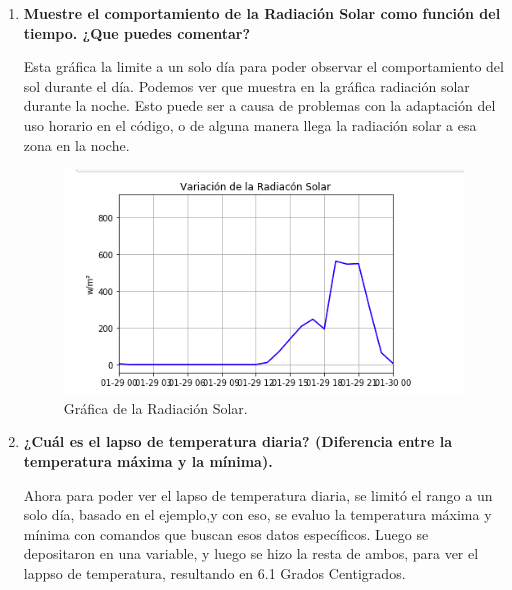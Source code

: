\documentclass[a4paper]{article}
\begin{document}
\begin{enumerate}
\item\textbf{Muestre el comportamiento de la Radiación Solar como función del tiempo. ¿Que puedes comentar?}

Esta gráfica la limite a un solo día para poder observar el comportamiento del sol durante el día. Podemos ver que muestra en la gráfica radiación solar durante la noche. Esto puede ser a causa de problemas con la adaptación del uso horario en el código, o de alguna manera llega la radiación solar a esa zona en la noche. 

\begin{figure}[h!]
  \centering
  \includegraphics[width=0.6\linewidth]{ActGraf3.png}
  \caption{Gráfica de la Radiación Solar.}
\end{figure}


\item\textbf{¿Cuál es el lapso de temperatura diaria? (Diferencia entre la temperatura máxima y la mínima).}

Ahora para poder ver el lapso de temperatura diaria, se limitó el rango a un solo día, basado en el ejemplo,y con eso, se evaluo la temperatura máxima y mínima con comandos que buscan esos datos específicos. Luego se depositaron en una variable, y luego se hizo la resta de ambos, para ver el lappso de temperatura, resultando en 6.1 Grados Centigrados. 


\end{enumerate}
\end{document}
